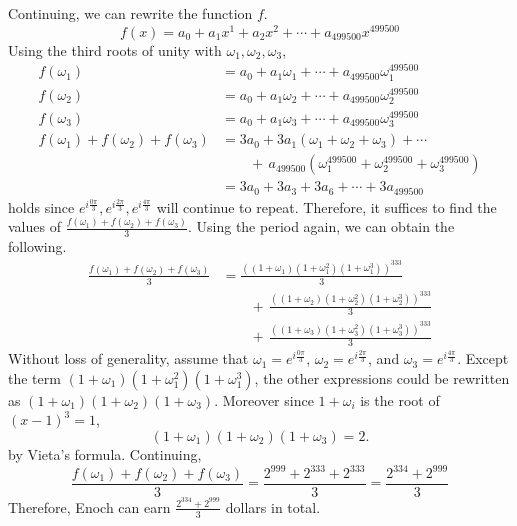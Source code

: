 \documentclass[../../main.tex]{subfiles}
\begin{document}
\begin{solution}
Continuing, we can rewrite the function $f$.
\[
f(x) = a_0 + a_1x^1 + a_2x^2 + \cdots + a_{499500}x^{499500}
\]
Using the third roots of unity with $\omega_1, \omega_2, \omega_3$,
\begin{align*}
    f(\omega_1)
    &= a_0 + a_1\omega_1 + \cdots + a_{499500}\omega_1^{499500} \\
    f(\omega_2)
    &= a_0 + a_1\omega_2 + \cdots + a_{499500}\omega_2^{499500} \\
    f(\omega_3)
    &= a_0 + a_1\omega_3 + \cdots + a_{499500}\omega_3^{499500}
    \\[0.5em]
    f(\omega_1) + f(\omega_2) + f(\omega_3)
    &= 3a_0 + 3a_1(\omega_1 + \omega_2 + \omega_3) + \cdots \\
    &\qquad + \, a_{499500} \left(
        \omega_1^{499500} + \omega_2^{499500} + \omega_3^{499500}
    \right) \\
    &= 3a_0 + 3a_3 + 3a_6 + \cdots + 3a_{499500}
\end{align*}
holds since $e^{ i \frac{0\pi}{3} }, e^{ i \frac{2\pi}{3} },
e^{ i \frac{4\pi}{3} }$ will continue to repeat. Therefore, it
suffices to find the values of $\frac{f(\omega_1) + f(\omega_2) +
f(\omega_3)}{3}$. Using the period again, we can obtain the following.
\begin{align*}
    \frac{ f(\omega_1) + f(\omega_2) + f(\omega_3) }{3}
    &= \frac{ \left(
        \left( 1 + \omega_1 \right)
        \left( 1 + \omega_1^2 \right)
        \left( 1 + \omega_1^3 \right)
    \right)^{333}}{3} \\
    &\qquad +\, \frac{ \left(
        \left( 1 + \omega_2 \right)
        \left( 1 + \omega_2^2 \right)
        \left( 1 + \omega_2^3 \right)
    \right)^{333}}{3} \\
    &\qquad +\, \frac{ \left(
        \left( 1 + \omega_3 \right)
        \left( 1 + \omega_3^2 \right)
        \left( 1 + \omega_3^3 \right)
    \right)^{333}}{3}
\end{align*}
Without loss of generality, assume that $\omega_1 =
e^{ i \frac{0\pi}{3} }$, $\omega_2 = e^{ i \frac{2\pi}{3} }$, and
$\omega_3 = e^{ i \frac{4\pi}{3} }$. Except the term
$\left( 1 + \omega_1 \right) \left( 1 + \omega_1^2 \right)
\left( 1 + \omega_1^3 \right)$, the other expressions
could be rewritten as $(1 + \omega_1)(1 + \omega_2)(1 + \omega_3)$.
Moreover since $1 + \omega_i$ is the root of $(x - 1)^3 = 1$,
\[
(1 + \omega_1)(1 + \omega_2)(1 + \omega_3) = 2.
\]
by Vieta's formula. Continuing,
\[
\frac{f(\omega_1) + f(\omega_2) + f(\omega_3)}{3}
= \frac{2^{999} + 2^{333} + 2^{333}}{3}
= \frac{2^{334} + 2^{999}}{3}
\]
Therefore, Enoch can earn $\frac{2^{334} + 2^{999}}{3}$ dollars in
total.
\end{solution}
\end{document}
